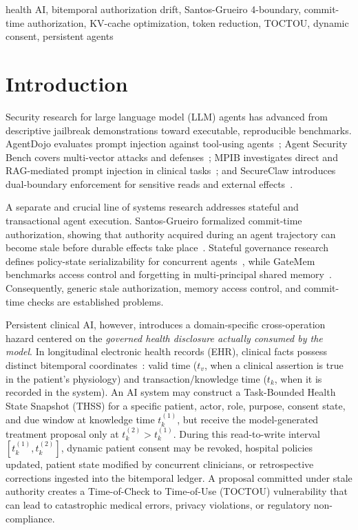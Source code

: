 \documentclass[conference,a4paper]{IEEEtran}
\begin{document}
\begin{IEEEkeywords}
health AI, bitemporal authorization drift, Santos-Grueiro 4-boundary, commit-time authorization, KV-cache optimization, token reduction, TOCTOU, dynamic consent, persistent agents
\end{IEEEkeywords}

\section{Introduction}
Security research for large language model (LLM) agents has advanced from descriptive jailbreak demonstrations toward executable, reproducible benchmarks. AgentDojo evaluates prompt injection against tool-using agents~\cite{agentdojo}; Agent Security Bench covers multi-vector attacks and defenses~\cite{asb}; MPIB investigates direct and RAG-mediated prompt injection in clinical tasks~\cite{mpib}; and SecureClaw introduces dual-boundary enforcement for sensitive reads and external effects~\cite{secureclaw}. 

A separate and crucial line of systems research addresses stateful and transactional agent execution. Santos-Grueiro formalized commit-time authorization, showing that authority acquired during an agent trajectory can become stale before durable effects take place~\cite{temporaryauth}. Stateful governance research defines policy-state serializability for concurrent agents~\cite{statefulgov}, while GateMem benchmarks access control and forgetting in multi-principal shared memory~\cite{gatemem}. Consequently, generic stale authorization, memory access control, and commit-time checks are established problems.

Persistent clinical AI, however, introduces a domain-specific cross-operation hazard centered on the \emph{governed health disclosure actually consumed by the model}. In longitudinal electronic health records (EHR), clinical facts possess distinct bitemporal coordinates~\cite{snodgrass1995,kumar1998}: valid time ($t_v$, when a clinical assertion is true in the patient's physiology) and transaction/knowledge time ($t_k$, when it is recorded in the system). An AI system may construct a Task-Bounded Health State Snapshot (THSS) for a specific patient, actor, role, purpose, consent state, and due window at knowledge time $t_k^{(1)}$, but receive the model-generated treatment proposal only at $t_k^{(2)} > t_k^{(1)}$. During this read-to-write interval $[t_k^{(1)}, t_k^{(2)}]$, dynamic patient consent may be revoked, hospital policies updated, patient state modified by concurrent clinicians, or retrospective corrections ingested into the bitemporal ledger. A proposal committed under stale authority creates a Time-of-Check to Time-of-Use (TOCTOU) vulnerability that can lead to catastrophic medical errors, privacy violations, or regulatory non-compliance.
\end{document}
